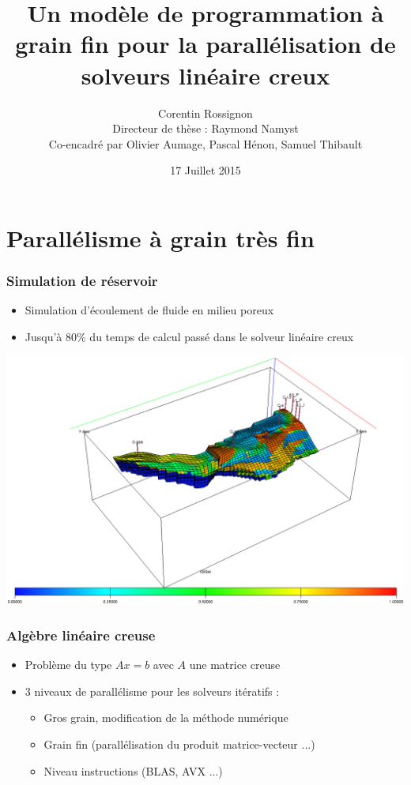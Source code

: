 \documentclass{beamer}
\title[Modèle de programmation à grain fin]{\huge{Un modèle de programmation à grain fin pour la parallélisation de solveurs linéaire creux}}
\author[Corentin Rossignon]{Corentin Rossignon \\Directeur de thèse : Raymond Namyst \\Co-encadré par Olivier Aumage, Pascal H\'{e}non, Samuel Thibault}
\institute[Total, Inria]{Total S.A., Inria Bordeaux, LaBRI, Universit{é} Bordeaux}
\date{17 Juillet 2015}
\begin{document}
\begin{frame}
  \titlepage
\end{frame}

\section{Parallélisme à grain très fin}
\begin{frame}
  \frametitle{Simulation de réservoir}

  \begin{itemize}
    \item Simulation d'écoulement de fluide en milieu poreux
    \item Jusqu'à 80\% du temps de calcul passé dans le solveur linéaire creux
  \end{itemize}

  \centerline{\includegraphics[width=0.9\linewidth]{reservoir}}
\end{frame}


\begin{frame}
  \frametitle{Algèbre linéaire creuse}

  \begin{itemize}
    \item Problème du type $Ax=b$ avec $A$ une matrice creuse
    \item 3 niveaux de parallélisme pour les solveurs itératifs :
    \begin{itemize}
      \item Gros grain, modification de la méthode numérique
      \item Grain fin (parallélisation du produit matrice-vecteur ...)
      \item Niveau instructions (BLAS, AVX ...)
    \end{itemize}
  \end{itemize}

\end{frame}
\end{document}
